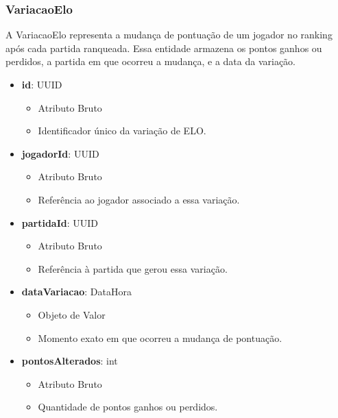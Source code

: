     \subsubsection{VariacaoElo}
    A VariacaoElo representa a mudança de pontuação de um jogador no ranking após cada partida ranqueada. Essa entidade armazena os pontos ganhos ou perdidos, a partida em que ocorreu a mudança, e a data da variação.
    \begin{itemize}
        \item \textbf{id}: UUID  
              \begin{itemize}
                  \item Atributo Bruto
                  \item Identificador único da variação de ELO.
              \end{itemize}
    
        \item \textbf{jogadorId}: UUID  
              \begin{itemize}
                  \item Atributo Bruto
                  \item Referência ao jogador associado a essa variação.
              \end{itemize}
    
        \item \textbf{partidaId}: UUID  
              \begin{itemize}
                  \item Atributo Bruto
                  \item Referência à partida que gerou essa variação.
              \end{itemize}
    
        \item \textbf{dataVariacao}: DataHora  
              \begin{itemize}
                  \item Objeto de Valor
                  \item Momento exato em que ocorreu a mudança de pontuação.
              \end{itemize}
    
        \item \textbf{pontosAlterados}: int  
              \begin{itemize}
                  \item Atributo Bruto
                  \item Quantidade de pontos ganhos ou perdidos.
              \end{itemize}
    

\end{itemize}
